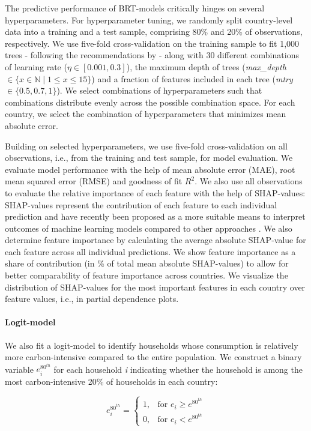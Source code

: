 \documentclass[12pt, a4paper]{article}
\begin{document}
The predictive performance of BRT-models critically hinges on several hyperparameters. For hyperparameter tuning, we randomly split country-level data into a training and a test sample, comprising 80\% and 20\% of observations, respectively. We use five-fold cross-validation on the training sample to fit 1,000 trees - following the recommendations by \textcite{Elith.2008} - along with 30 different combinations of learning rate ($\eta \in [0.001,0.3]$), the maximum depth of trees (\textit{max\_depth} $\in \{x \in \mathbb{N} \mid 1  \leq x \leq 15 \}$) and a fraction of features included in each tree (\textit{mtry} $\in \{0.5,0.7,1\}$). We select combinations of hyperparameters such that combinations distribute evenly across the possible combination space. For each country, we select the combination of hyperparameters that minimizes mean absolute error.

Building on selected hyperparameters, we use five-fold cross-validation on all observations, i.e., from the training and test sample, for model evaluation. We evaluate model performance with the help of mean absolute error (MAE), root mean squared error (RMSE) and goodness of fit $R^{2}$. We also use all observations to evaluate the relative importance of each feature with the help of SHAP-values: SHAP-values represent the contribution of each feature to each individual prediction and have recently been proposed as a more suitable means to interpret outcomes of machine learning models compared to other approaches \autocite{Lundberg.2020}. We also determine feature importance by calculating the average absolute SHAP-value for each feature across all individual predictions. We show feature importance as a share of contribution (in \% of total mean absolute SHAP-values) to allow for better comparability of feature importance across countries. We visualize the distribution of SHAP-values for the most important features in each country over feature values, i.e., in partial dependence plots. 

\paragraph{Logit-model} We also fit a logit-model to identify households whose consumption is relatively more carbon-intensive compared to the entire population. We construct a binary variable $e_{i}^{80^{th}}$ for each household \textit{i} indicating whether the household is among the most carbon-intensive 20\% of households in each country:

\begin{equation}
    e_{i}^{80^{th}} =
    \begin{cases}
    1, & \text{for }  e_{i} \geq e^{80^{th}} \\
    0, & \text{for }  e_{i} < e^{80^{th}}
    \end{cases}
\end{equation}
\end{document}
